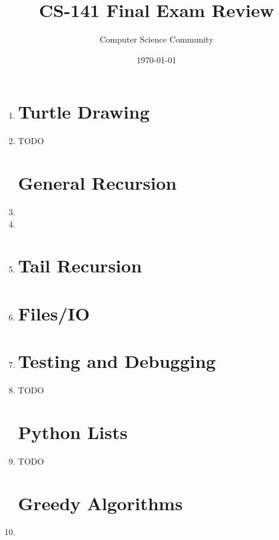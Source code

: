 \documentclass[11pt]{article}
\author{Computer Science Community}
\title{CS-141 Final Exam Review}
\date{\today}
\begin{document}
\header

\begin{enumerate}

\section*{Python Basics}
	\item 

\section*{Turtle Drawing}
	\item TODO %

\section*{General Recursion}
	\item 

	\item 

	\item 

\section*{Tail Recursion}
	\item 

\section*{Files/IO}
	\item 

\section*{Testing and Debugging}
	\item TODO %

\section*{Python Lists}
	\item TODO %

\section*{Greedy Algorithms}
	\item 


\end{enumerate}
\end{document}

